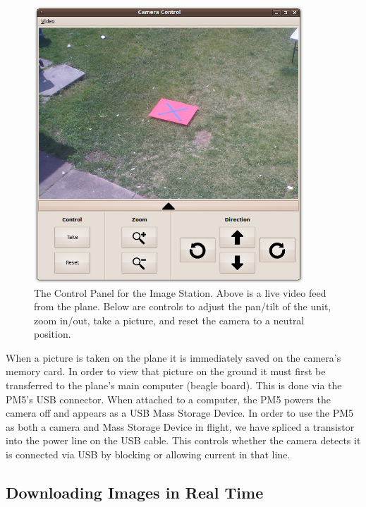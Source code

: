 \documentclass[10pt]{report}
\begin{document}
\begin{figure} [H]
  \centering
  	\includegraphics[width=0.9\textwidth]{../images/ImageStationControls.jpg}
  	\caption[Image Station Control Panel]{The Control Panel for the Image Station.  Above is a live video feed from the plane.  Below are controls to adjust the pan/tilt of the unit, zoom in/out, take a picture, and reset the camera to a neutral position.}
  	\label{fig:imagestationcontrols}
\end{figure}

When a picture is taken on the plane it is immediately saved on the camera's memory card.  In order to view that picture on the ground it must first be transferred to the plane's main computer (beagle board).  This is done via the PM5's USB connector.  When attached to a computer, the PM5 powers the camera off and appears as a USB Mass Storage Device. In order to use the PM5 as both a camera and Mass Storage Device in flight, we have spliced a transistor into the power line on the USB cable. This controls whether the camera detects it is connected via USB by blocking or allowing current in that line.

\subsection{Downloading Images in Real Time}
\end{document}

